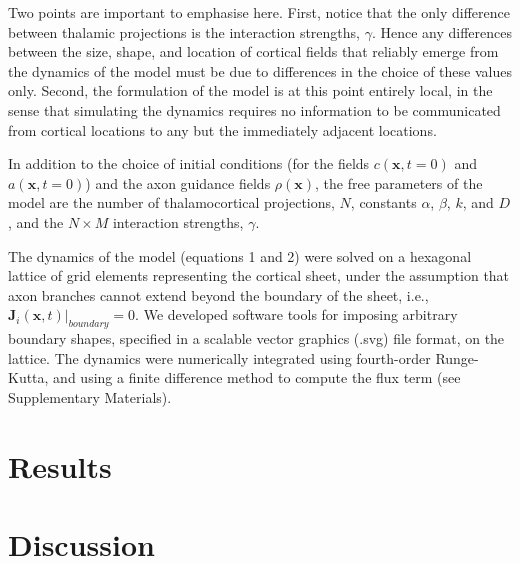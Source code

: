 \documentclass[a4paper,11pt]{article}
\newcommand{\mb}[1]{\mathbf{#1}}
\begin{document}
Two points are important to emphasise here. First, notice that the only difference between thalamic projections is the interaction strengths, $\gamma$. Hence any differences between the size, shape, and location of cortical fields that reliably emerge from the dynamics of the model must be due to differences in the choice of these values only. Second, the formulation of the model is at this point entirely local, in the sense that simulating the dynamics requires no information to be communicated from cortical locations to any but the immediately adjacent locations. 

In addition to the choice of initial conditions (for the fields $c(\mb{x},t=0)$ and $a(\mb{x},t=0)$) and the axon guidance fields $\rho(\mb{x})$, the free parameters of the model are the number of thalamocortical projections, $N$, constants $\alpha$, $\beta$, $k$, and $D$, and the $N\times M$ interaction strengths, $\gamma$. 

The dynamics of the model (equations 1 and 2) were solved on a hexagonal lattice of grid elements representing the cortical sheet, under the assumption that axon branches cannot extend beyond the boundary of the sheet, i.e., $\mb{J}_i(\mb{x},t) \bigg\rvert_{boundary} = 0$. We developed software tools for imposing arbitrary boundary shapes, specified in a scalable vector graphics (.svg) file format, on the lattice. The dynamics were numerically integrated using fourth-order Runge-Kutta, and using a {\color{red} finite difference method} to compute the flux term (see Supplementary Materials).



\section*{Results}






\section*{Discussion}
\end{document}
